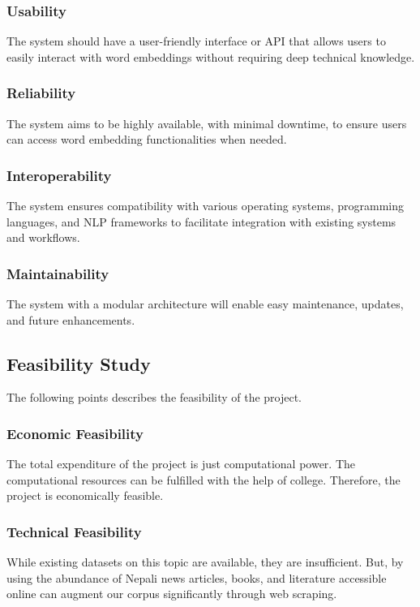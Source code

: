             \subsubsection{Usability}            
            The system should have a user-friendly interface or API that allows users to easily interact with word embeddings without requiring deep technical knowledge.

            \subsubsection{Reliability}
            The system aims to be highly available, with minimal downtime, to ensure users can access word embedding functionalities when needed.

            \subsubsection{Interoperability}
            The system ensures compatibility with various operating systems, programming languages, and NLP frameworks to facilitate integration with existing systems and workflows.

            \subsubsection{Maintainability}            
            The system with a modular architecture will enable easy maintenance, updates, and future enhancements.


        \subsection{Feasibility Study}
            The following points describes the feasibility of the project.

            \subsubsection{Economic Feasibility}
                The total expenditure of the project is just computational power. The computational resources can be fulfilled with the help of college. Therefore, the project is economically feasible.

            \subsubsection{Technical Feasibility}
                While existing datasets on this topic are available, they are insufficient. But, by using the abundance of Nepali news articles, books, and literature accessible online can augment our corpus significantly through web scraping.

